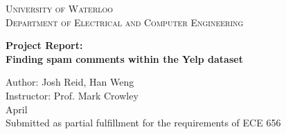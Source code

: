 \documentclass[12pt]{article}
\begin{document}
\begin{titlepage}
	\begin{center}
		{\hphantom{M}}
		\vspace{1cm}
		{\scshape\Huge{University of Waterloo}}\\
		\vspace{2cm}
		{\scshape\Large Department of Electrical and Computer Engineering}\\
		\vspace{1.5cm}
		\begin{spacing}{2.5}
		{\LARGE\bfseries Project Report:\\ Finding spam comments within the Yelp dataset}\\
		\end{spacing}
		\vspace{2cm}
		{\Large{Author: Josh Reid, Han Weng \vspace{1em} \\ Instructor: Prof. Mark Crowley}}
		\vspace{1cm}\\
		{\Large April}\\
		\vspace{6em}
		{\Large Submitted as partial fulfillment for the requirements of ECE 656}
	\end{center}
\end{titlepage}
\end{document}
